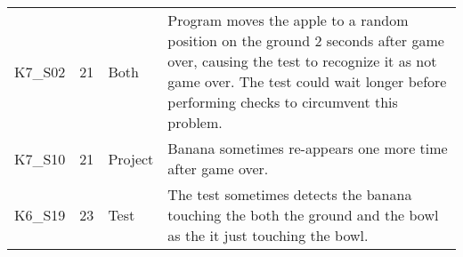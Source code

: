 \begin{table}[htpb]
{\begin{tabular}{lrlp{11.25cm}}
        K7\_S02 & 21   & Both    & Program moves the apple to a random position on the ground 2 seconds after game over, causing the test to recognize it as not game over.
                                   The test could wait longer before performing checks to circumvent this problem. \\
        K7\_S10 & 21   & Project & Banana sometimes re-appears one more time after game over. \\
        K6\_S19 & 23   & Test    & The test sometimes detects the banana touching the both the ground and the bowl as the it just touching the bowl. \\


\end{tabular}}
\end{table}
